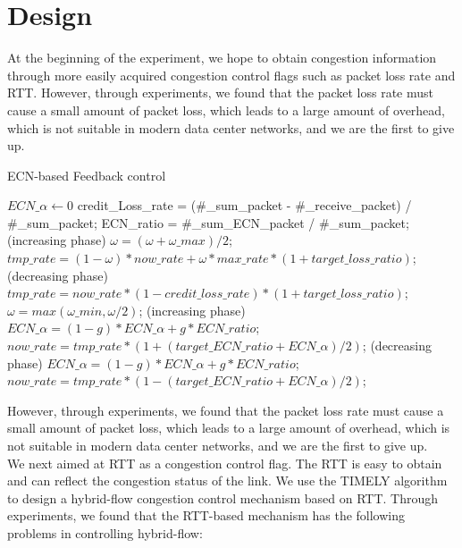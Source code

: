 \documentclass[conference]{IEEEtran}
\begin{document}
\section{Design}
At the beginning of the experiment, we hope to obtain congestion information through more easily acquired congestion control flags such as packet loss rate and RTT. However, through experiments, we found that the packet loss rate must cause a small amount of packet loss, which leads to a large amount of overhead, which is not suitable in modern data center networks, and we are the first to give up.\\
\begin{algorithm}[!h]
\caption{ECN-based Feedback control}
\begin{algorithmic}[1]
\STATE $ECN\_\alpha \gets 0$
\REPEAT
\STATE credit\_Loss\_rate = (\#\_sum\_packet - \#\_receive\_packet) / \#\_sum\_packet;
\STATE ECN\_ratio = \#\_sum\_ECN\_packet / \#\_sum\_packet;
        \STATE (increasing phase)
        \STATE $\omega=(\omega+\omega\_max)/2$;
        \STATE $tmp\_rate = (1-\omega) * now\_rate +\omega*max\_rate*(1+ target\_loss\_ratio)$;
\ELSE
        \STATE (decreasing phase)
        \STATE $tmp\_rate=now\_rate*(1-credit\_loss\_rate)*(1+target\_loss\_ratio)$;
        \STATE $\omega=max(\omega\_min,\omega/2)$;
\ENDIF
{}
        \STATE (increasing phase)
        \STATE $ECN\_\alpha = (1-g)* ECN\_\alpha+g * ECN\_ratio$;
        \STATE $now\_rate = tmp\_rate*(1+(target\_ECN\_ratio +ECN\_\alpha) / 2)$;
\ELSE
        \STATE (decreasing phase)
        \STATE $ECN\_\alpha =(1-g)* ECN\_\alpha+g*ECN\_ratio$;
        \STATE $now\_rate = tmp\_rate*(1-(target\_ECN\_ratio +ECN\_\alpha) / 2)$;
\ENDIF
{}
\end{algorithmic}
\end{algorithm}
\indent However, through experiments, we found that the packet loss rate must cause a small amount of packet loss, which leads to a large amount of overhead, which is not suitable in modern data center networks, and we are the first to give up.\\
\indent We next aimed at RTT as a congestion control flag. The RTT is easy to obtain and can reflect the congestion status of the link. We use the TIMELY\cite{mittal2015timely} algorithm to design a hybrid-flow congestion control mechanism based on RTT. Through experiments, we found that the RTT-based mechanism has the following problems in controlling hybrid-flow:
\end{document}
